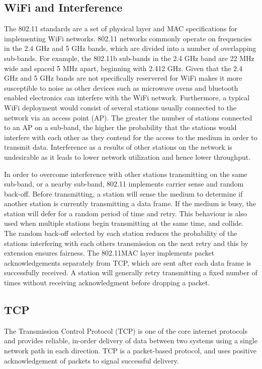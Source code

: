 \subsection{WiFi and Interference}
The 802.11 standards are a set of physical layer and MAC specifications for
implementing WiFi networks.  802.11 networks commonly operate on frequencies in
the 2.4 GHz and 5 GHz bands, which are divided into a number of overlapping
sub-bands. For example, the 802.11b sub-bands in the 2.4 GHz band are 22 MHz 
wide and spaced 5 MHz apart, beginning with 2.412 GHz. Given that the 2.4 GHz 
and 5 GHz bands are not specifically reservered for WiFi makes it more 
susceptible to noise as other devices such as microwave ovens and bluetooth 
enabled electronics can interfere with the WiFi network. Furthermore, a typical 
WiFi deployment would consist of several stations usually connected to the 
network via an access point (AP). The greater the number of stations connected 
to an AP on a sub-band, the higher the probability that the stations would 
interfere with each other as they contend for the access to the medium in order 
to transmit data. Interference as a results of other stations on the network is 
undesirable as it leads to lower network utilization and hence lower throughput.

In order to overcome interference with other stations transmitting on the same
sub-band, or a nearby sub-band, 802.11 implements carrier sense and random
back-off. Before transmitting, a station will sense the medium to determine if
another station is currently transmitting a data frame. If the medium is busy,
the station will defer for a random period of time and retry. This behaviour is
also used when multiple stations begin transmitting at the same time, and
collide. The random back-off selected by each station reduces the probability 
of the stations interfering with each others transmission on the next retry and 
this by extension ensures fairness.
The 802.11MAC layer implements packet acknowledgements separately from
TCP, which are sent after each data frame is successfully received. A station
will generally retry transmitting a fixed number of times without receiving
acknowledgment before dropping a packet.

\subsection{TCP}
The Transmission Control Protocol (TCP) is one of the core internet protocols
and provides reliable, in-order delivery of data between two systems using a
single network path in each direction. TCP is a packet-based protocol, and uses
positive acknowledgement of packets to signal successful delivery.

